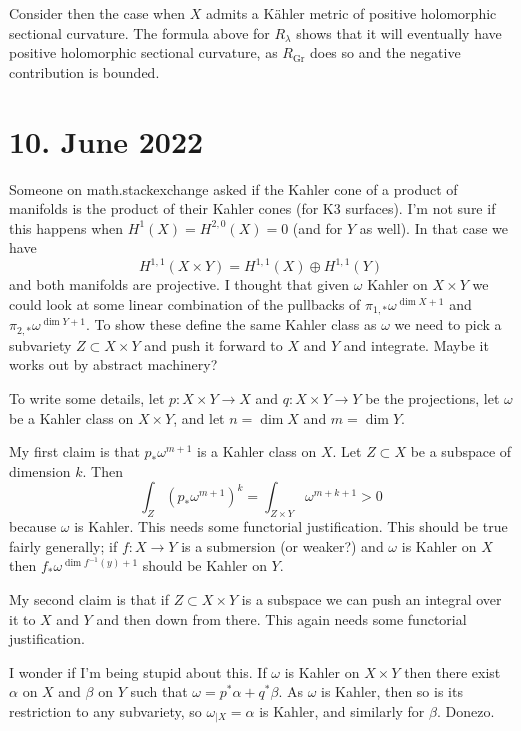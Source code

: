\documentclass[11pt]{article}
\theoremstyle{definition}
\DeclareMathOperator{\Gr}{Gr}
\begin{document}
Consider then the case when $X$ admits a K\"ahler metric of positive holomorphic sectional curvature. The formula above for $R_{\lambda}$ shows that it will eventually have positive holomorphic sectional curvature, as $R_{\Gr}$ does so and the negative contribution is bounded.






\section*{10. June 2022}

Someone on math.stackexchange asked if the Kahler cone of a product of manifolds is the product of their Kahler cones (for K3 surfaces). I'm not sure if this happens when $H^{1}(X) = H^{2,0}(X) = 0$ (and for $Y$ as well). In that case we have
\[
  H^{1,1}(X \times Y) = H^{1,1}(X) \oplus H^{1,1}(Y)
\]
and both manifolds are projective. I thought that given $\omega$ Kahler on $X \times Y$ we could look at some linear combination of the pullbacks of $\pi_{1,*} \omega^{\dim X+1}$ and $\pi_{2,*}\omega^{\dim Y+1}$. To show these define the same Kahler class as $\omega$ we need to pick a subvariety $Z \subset X \times Y$ and push it forward to $X$ and $Y$ and integrate. Maybe it works out by abstract machinery?

To write some details, let $p : X \times Y \to X$ and $q : X \times Y \to Y$ be the projections, let $\omega$ be a Kahler class on $X \times Y$, and let $n = \dim X$ and $m = \dim Y$.

My first claim is that $p_{*} \omega^{m+1}$ is a Kahler class on $X$. Let $Z \subset X$ be a subspace of dimension $k$. Then
\[
  \int_{Z} (p_{*} \omega^{m+1})^{k}
  = \int_{Z \times Y} \omega^{m+k+1}
  > 0
\]
because $\omega$ is Kahler. This needs some functorial justification. This should be true fairly generally; if $f : X \to Y$ is a submersion (or weaker?) and $\omega$ is Kahler on $X$ then $f_{*}\omega^{\dim f^{-1}(y)+1}$ should be Kahler on $Y$.

My second claim is that if $Z \subset X \times Y$ is a subspace we can push an integral over it to $X$ and $Y$ and then down from there. This again needs some functorial justification.

I wonder if I'm being stupid about this. If $\omega$ is Kahler on $X \times Y$ then there exist $\alpha$ on $X$ and $\beta$ on $Y$ such that $\omega = p^{*}\alpha + q^{*}\beta$. As $\omega$ is Kahler, then so is its restriction to any subvariety, so $\omega_{|X} = \alpha$ is Kahler, and similarly for $\beta$. Donezo.
\end{document}
